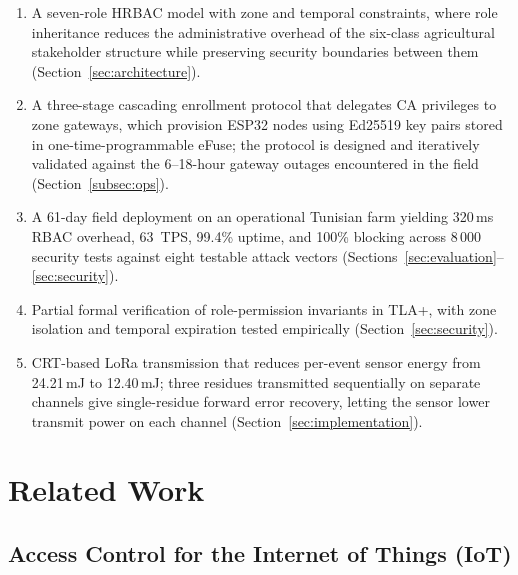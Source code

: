 \documentclass[a4paper,fleqn]{cas-dc}
\begin{document}
\begin{enumerate}
\item A seven-role HRBAC model with zone and temporal constraints,
  where role inheritance reduces the administrative overhead of the
  six-class agricultural stakeholder structure while preserving security
  boundaries between them (Section~\ref{sec:architecture}).

\item A three-stage cascading enrollment protocol that delegates CA
  privileges to zone gateways, which provision ESP32 nodes using
  Ed25519 key pairs stored in one-time-programmable eFuse; the
  protocol is designed and iteratively validated against the 6--18-hour
  gateway outages encountered in the field (Section~\ref{subsec:ops}).

\item A 61-day field deployment on an operational Tunisian farm
  yielding 320\,ms RBAC overhead, 63~TPS, 99.4\% uptime, and 100\%
  blocking across 8\,000 security tests against eight testable attack
  vectors (Sections~\ref{sec:evaluation}--\ref{sec:security}).

\item Partial formal verification of role-permission invariants in TLA+,
  with zone isolation and temporal expiration tested empirically
  (Section~\ref{sec:security}).

\item CRT-based LoRa transmission that reduces per-event sensor energy
  from 24.21\,mJ to 12.40\,mJ; three residues transmitted sequentially
  on separate channels give single-residue forward error recovery,
  letting the sensor lower transmit power on each channel
  (Section~\ref{sec:implementation}).
\end{enumerate}

\section{Related Work}
\label{sec:related}

\subsection{Access Control for the Internet of Things (IoT)}
\label{subsec:ac_iot}
\end{document}
